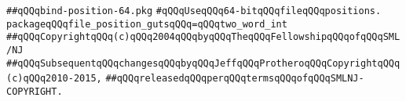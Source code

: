 \label{src/lib/std/src/bind-position-64.pkg}
\verb|##qQQqbind-position-64.pkg|\newline
\newline
\verb|#qQQqUseqQQq64-bitqQQqfileqQQqpositions.|\newline
\newline
\verb|packageqQQqfile_position_gutsqQQq=qQQqtwo_word_int|\newline
\newline
\newline
\verb|##qQQqCopyrightqQQq(c)qQQq2004qQQqbyqQQqTheqQQqFellowshipqQQqofqQQqSML/NJ|\newline
\verb|##qQQqSubsequentqQQqchangesqQQqbyqQQqJeffqQQqProtheroqQQqCopyrightqQQq(c)qQQq2010-2015,|\newline
\verb|##qQQqreleasedqQQqperqQQqtermsqQQqofqQQqSMLNJ-COPYRIGHT.|\newline

